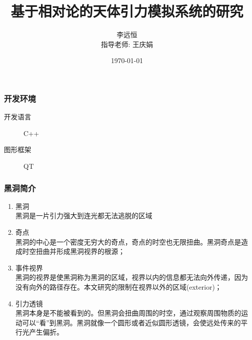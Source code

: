 \documentclass{beamer}
\title[General Relativity Raytracer]{基于相对论的天体引力模拟系统的研究} %
\author[李远恒]{李远恒\\ \vspace{3mm}\footnotesize 指导老师: 王庆娟}     %
\institute[BITZH] %
{
北京理工大学珠海学院 \\ %
\medskip
\textit{liyh2077@gmail.com} %
}
\date{\today} %
\begin{document}
\begin{frame}
    \titlepage %
\end{frame}




\begin{frame}
    \frametitle{开发环境}
    \begin{description}
        \item[开发语言] C++
        \item[图形框架] QT
    \end{description}
\end{frame}

\begin{frame}
    \frametitle{黑洞简介}
    \begin{enumerate}
        \item 黑洞 \\ 黑洞是一片引力强大到连光都无法逃脱的区域
        \item 奇点 \\ 黑洞的中心是一个密度无穷大的奇点，奇点的时空也无限扭曲。黑洞奇点是造成时空扭曲并形成黑洞视界的根源；
        \item 事件视界 \\ 黑洞的视界是使黑洞称为黑洞的区域，视界以内的信息都无法向外传递，因为没有向外的路径存在。本文研究的限制在视界以外的区域(exterior)；
        \item 引力透镜 \\ 黑洞本身是不能被看到的。但黑洞会扭曲周围的时空，通过观察周围物质的运动可以“看”到黑洞。黑洞就像一个圆形或者近似圆形透镜，会使远处传来的平行光产生偏折。
    \end{enumerate}

\end{frame}
\end{document}
